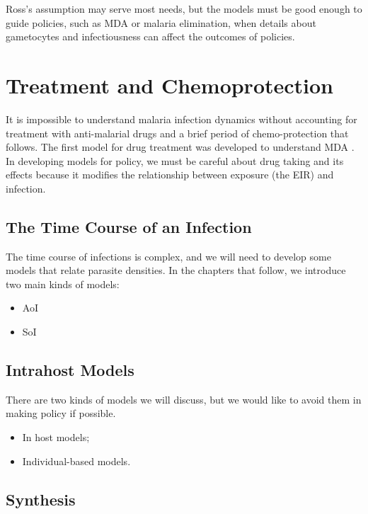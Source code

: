 \documentclass[
]{book}
\begin{document}
Ross's assumption may serve most needs, but the models must be good enough to guide policies, such as MDA or malaria elimination, when details about gametocytes and infectiousness can affect the outcomes of policies.

\section{Treatment and Chemoprotection}\label{treatment-and-chemoprotection}

It is impossible to understand malaria infection dynamics without accounting for treatment with anti-malarial drugs and a brief period of chemo-protection that follows. The first model for drug treatment was developed to understand MDA \autocite{DietzK1975ModelsParasitic}. In developing models for policy, we must be careful about drug taking and its effects because it modifies the relationship between exposure (the EIR) and infection.

\subsection{The Time Course of an Infection}\label{the-time-course-of-an-infection}

The time course of infections is complex, and we will need to develop some models that relate parasite densities. In the chapters that follow, we introduce two main kinds of models:

\begin{itemize}
\item
  AoI
\item
  SoI
\end{itemize}

\subsection{Intrahost Models}\label{intrahost-models}

There are two kinds of models we will discuss, but we would like to avoid them in making policy if possible.

\begin{itemize}
\item
  In host models;
\item
  Individual-based models.
\end{itemize}

\subsection{Synthesis}\label{synthesis}
\end{document}
